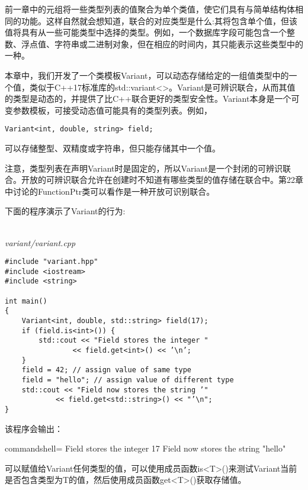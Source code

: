 前一章中的元组将一些类型列表的值聚合为单个类值，使它们具有与简单结构体相同的功能。这样自然就会想知道，联合的对应类型是什么:其将包含单个值，但该值将具有从一些可能类型中选择的类型。例如，一个数据库字段可能包含一个整数、浮点值、字符串或二进制对象，但在相应的时间内，其只能表示这些类型中的一种。

本章中，我们开发了一个类模板Variant，可以动态存储给定的一组值类型中的一个值，类似于C++17标准库的std::variant<>。Variant是可辨识联合，从而其值的类型是动态的，并提供了比C++联合更好的类型安全性。Variant本身是一个可变参数模板，可接受动态值可能具有的类型列表。例如，

\begin{lstlisting}[style=styleCXX]
Variant<int, double, string> field;
\end{lstlisting}

可以存储整型、双精度或字符串，但只能存储其中一个值。

\begin{tcolorbox}[colback=webgreen!5!white,colframe=webgreen!75!black]
\hspace*{0.75cm}注意，类型列表在声明Variant时是固定的，所以Variant是一个封闭的可辨识联合。开放的可辨识联合允许在创建时不知道有哪些类型的值存储在联合中。第22章中讨论的FunctionPtr类可以看作是一种开放可识别联合。
\end{tcolorbox}

下面的程序演示了Variant的行为:

\hspace*{\fill} \\ %
\noindent
\textit{variant/variant.cpp}
\begin{lstlisting}[style=styleCXX]
#include "variant.hpp"
#include <iostream>
#include <string>
 
int main()
{
	Variant<int, double, std::string> field(17);
	if (field.is<int>()) {
		std::cout << "Field stores the integer "
				<< field.get<int>() << ’\n’;
	}
	field = 42; // assign value of same type
	field = "hello"; // assign value of different type
	std::cout << "Field now stores the string ’"
			<< field.get<std::string>() << "’\n";
}
\end{lstlisting}

该程序会输出：

\begin{tcblisting}{commandshell={}}
Field stores the integer 17
Field now stores the string "hello"
\end{tcblisting}

可以赋值给Variant任何类型的值，可以使用成员函数is<T>()来测试Variant当前是否包含类型为T的值，然后使用成员函数get<T>()获取存储值。































